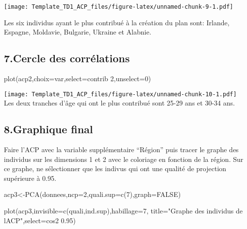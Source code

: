 \documentclass[
]{article}
\newenvironment{Shaded}{\begin{snugshade}}{\end{snugshade}}
\newcommand{\AttributeTok}[1]{\textcolor[rgb]{0.77,0.63,0.00}{#1}}
\newcommand{\ConstantTok}[1]{\textcolor[rgb]{0.00,0.00,0.00}{#1}}
\newcommand{\DecValTok}[1]{\textcolor[rgb]{0.00,0.00,0.81}{#1}}
\newcommand{\FunctionTok}[1]{\textcolor[rgb]{0.00,0.00,0.00}{#1}}
\newcommand{\NormalTok}[1]{#1}
\newcommand{\OtherTok}[1]{\textcolor[rgb]{0.56,0.35,0.01}{#1}}
\newcommand{\StringTok}[1]{\textcolor[rgb]{0.31,0.60,0.02}{#1}}
\begin{document}
\texttt{[image: Template\_TD1\_ACP\_files/figure-latex/unnamed-chunk-9-1.pdf]}

Les six individus ayant le plus contribué à la création du plan sont:
Irlande, Espagne, Moldavie, Bulgarie, Ukraine et Alabnie.

\hypertarget{cercle-des-corruxe9lations}{%
\subsection{7.Cercle des
corrélations}\label{cercle-des-corruxe9lations}}

\begin{Shaded}
\begin{Highlighting}[]
\FunctionTok{plot}\NormalTok{(acp2,}\AttributeTok{choix=}\StringTok{\textquotesingle{}var\textquotesingle{}}\NormalTok{,}\AttributeTok{select=}\StringTok{\textquotesingle{}contrib  2\textquotesingle{}}\NormalTok{,}\AttributeTok{unselect=}\DecValTok{0}\NormalTok{)}
\end{Highlighting}
\end{Shaded}

\texttt{[image: Template\_TD1\_ACP\_files/figure-latex/unnamed-chunk-10-1.pdf]}
Les deux tranches d'âge qui ont le plus contribué sont 25-29 ans et
30-34 ans.

\hypertarget{graphique-final}{%
\subsection{8.Graphique final}\label{graphique-final}}

Faire l'ACP avec la variable supplémentaire ``Région'' puis tracer le
graphe des individus sur les dimensions 1 et 2 avec le coloriage en
fonction de la région. Sur ce graphe, ne sélectionner que les indivus
qui ont une qualité de projection supérieure à 0.95.

\begin{Shaded}
\begin{Highlighting}[]
\NormalTok{acp3}\OtherTok{\textless{}{-}}\FunctionTok{PCA}\NormalTok{(donnees,}\AttributeTok{ncp=}\DecValTok{2}\NormalTok{,}\AttributeTok{quali.sup=}\FunctionTok{c}\NormalTok{(}\DecValTok{7}\NormalTok{),}\AttributeTok{graph=}\ConstantTok{FALSE}\NormalTok{)}
\end{Highlighting}
\end{Shaded}

\begin{Shaded}
\begin{Highlighting}[]
\FunctionTok{plot}\NormalTok{(acp3,}\AttributeTok{invisible=}\FunctionTok{c}\NormalTok{(}\StringTok{\textquotesingle{}quali\textquotesingle{}}\NormalTok{,}\StringTok{\textquotesingle{}ind.sup\textquotesingle{}}\NormalTok{),}\AttributeTok{habillage=}\DecValTok{7}\NormalTok{,}
     \AttributeTok{title=}\StringTok{"Graphe des individus de l\textquotesingle{}ACP"}\NormalTok{,}\AttributeTok{select=}\StringTok{\textquotesingle{}cos2  0.95\textquotesingle{}}\NormalTok{)}
\end{Highlighting}
\end{Shaded}
\end{document}
